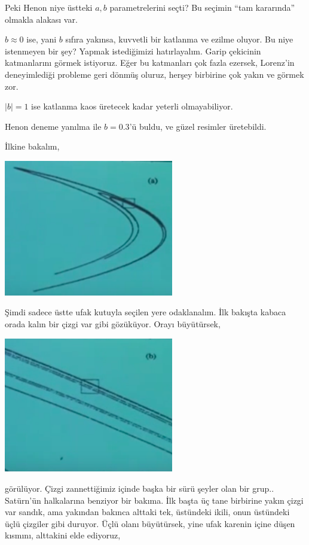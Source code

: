 \documentclass[12pt,fleqn]{article}\usepackage{../../common}
\begin{document}
Peki Henon niye üstteki $a,b$ parametrelerini seçti? Bu seçimin ``tam
kararında'' olmakla alakası var. 

$b \approx 0$ ise, yani $b$ sıfıra yakınsa, kuvvetli bir katlanma ve ezilme
oluyor. Bu niye istenmeyen bir şey? Yapmak istediğimizi hatırlayalım. Garip
çekicinin katmanlarını görmek istiyoruz. Eğer bu katmanları çok fazla
ezersek, Lorenz'in deneyimlediği probleme geri dönmüş oluruz, herşey
birbirine çok yakın ve görmek zor.

$|b| = 1$ ise katlanma kaos üretecek kadar yeterli olmayabiliyor. 

Henon deneme yanılma ile $b=0.3$'ü buldu, ve güzel resimler üretebildi. 

İlkine bakalım,

\includegraphics[width=20em]{24_06.png}

Şimdi sadece üstte ufak kutuyla seçilen yere odaklanalım. İlk bakışta
kabaca orada kalın bir çizgi var gibi gözüküyor. Orayı büyütürsek,

\includegraphics[width=20em]{24_07.png}

görülüyor. Çizgi zannettiğimiz içinde başka bir sürü şeyler olan bir
grup.. Satürn'ün halkalarına benziyor bir bakıma. İlk başta üç tane
birbirine yakın çizgi var sandık, ama yakından bakınca alttaki tek,
üstündeki ikili, onun üstündeki üçlü çizgiler gibi duruyor. Üçlü olanı
büyütürsek, yine ufak karenin içine düşen kısmını, alttakini elde ediyoruz,
\end{document}
